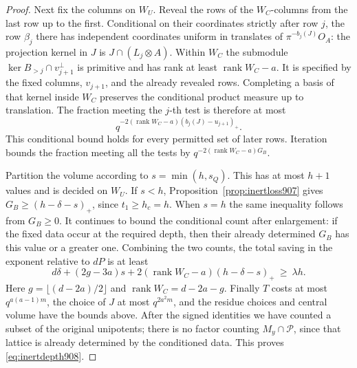 \documentclass[a4paper,11pt]{article}
\theoremstyle{definition}
\theoremstyle{remark}
\numberwithin{equation}{section}
\begin{document}
\begin{proof}
Next fix the columns on \(W_U\). Reveal the rows of the
\(W_C\)-columns from the last row up to the first. Conditional
on their coordinates strictly after row \(j\), the row
\(\beta_j\) there has independent coordinates uniform in
translates of \(\pi^{-b_j(J)}O_A\): the projection kernel
in \(J\) is \(J\cap(L_j\otimes A)\). Within \(W_C\) the
submodule \(\ker B_{>j}\cap v_{j+1}^\perp\) is primitive and
has rank at least \(\operatorname{rank}W_C-a\). It is specified
by the fixed columns, \(v_{j+1}\), and the already revealed
rows. Completing a basis of that kernel inside \(W_C\)
preserves the conditional product measure up to translation.
The fraction meeting the \(j\)-th test is therefore at most
\[
           q^{-2(\operatorname{rank}W_C-a)(b_j(J)-u_{j+1})_+}.
\]
This conditional bound holds for every permitted set of later
rows. Iteration bounds the fraction meeting all the tests by
\(q^{-2(\operatorname{rank}W_C-a)G_B}\).

Partition the volume according to \(s=\min(h,s_Q)\).
This has at most \(h+1\) values and is decided on \(W_U\).
If \(s<h\), Proposition~\ref{prop:inertloss907} gives
\(G_B\ge(h-\delta-s)_+\), since \(t_1\ge h_c=h\).
When \(s=h\) the same inequality follows from \(G_B\ge0\).
It continues to bound the conditional count after enlargement:
if the fixed data occur at the required depth, then their
already determined \(G_B\) has this value or a greater one.
Combining the two counts, the total saving in the exponent
relative to \(dP\) is at least
\[
 d\delta+(2g-3a)s+
          2(\operatorname{rank}W_C-a)(h-\delta-s)_+
                                  \ \ge\ \lambda h .
\]
Here \(g=\lfloor(d-2a)/2\rfloor\) and
\(\operatorname{rank}W_C=d-2a-g\).
Finally \(T\) costs at most \(q^{a(a-1)m}\), the choice of
\(J\) at most \(q^{2a^2m}\), and the residue choices and
central volume have the bounds above.
After the signed identities we have counted a subset of
the original unipotents; there is no factor counting
\(M_y\cap\mathcal P\), since that lattice is already determined
by the conditioned data. This proves \eqref{eq:inertdepth908}.
\end{proof}
\end{document}
